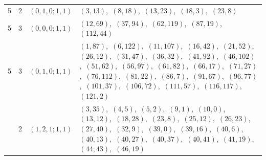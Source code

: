 \documentclass[11pt]{article}
\begin{document}
\begin{longtable}{@{}rrl>{\raggedright\arraybackslash}p{}@{}}
5 & 2 & $(0,1,0;1,1)$ & $(3,13)$,\allowbreak\ $(8,18)$,\allowbreak\ $(13,23)$,\allowbreak\ $(18,3)$,\allowbreak\ $(23,8)$\\
5 & 3 & $(0,0,0;1,1)$ & $(12,69)$,\allowbreak\ $(37,94)$,\allowbreak\ $(62,119)$,\allowbreak\ $(87,19)$,\allowbreak\ $(112,44)$\\
5 & 3 & $(0,1,0;1,1)$ & $(1,87)$,\allowbreak\ $(6,122)$,\allowbreak\ $(11,107)$,\allowbreak\ $(16,42)$,\allowbreak\ $(21,52)$,\allowbreak\ $(26,12)$,\allowbreak\ $(31,47)$,\allowbreak\ $(36,32)$,\allowbreak\ $(41,92)$,\allowbreak\ $(46,102)$,\allowbreak\ $(51,62)$,\allowbreak\ $(56,97)$,\allowbreak\ $(61,82)$,\allowbreak\ $(66,17)$,\allowbreak\ $(71,27)$,\allowbreak\ $(76,112)$,\allowbreak\ $(81,22)$,\allowbreak\ $(86,7)$,\allowbreak\ $(91,67)$,\allowbreak\ $(96,77)$,\allowbreak\ $(101,37)$,\allowbreak\ $(106,72)$,\allowbreak\ $(111,57)$,\allowbreak\ $(116,117)$,\allowbreak\ $(121,2)$\\
\addlinespace[3pt]
7 & 2 & $(1,2,1;1,1)$ & $(3,35)$,\allowbreak\ $(4,5)$,\allowbreak\ $(5,2)$,\allowbreak\ $(9,1)$,\allowbreak\ $(10,0)$,\allowbreak\ $(13,12)$,\allowbreak\ $(18,28)$,\allowbreak\ $(23,8)$,\allowbreak\ $(25,12)$,\allowbreak\ $(26,23)$,\allowbreak\ $(27,40)$,\allowbreak\ $(32,9)$,\allowbreak\ $(39,0)$,\allowbreak\ $(39,16)$,\allowbreak\ $(40,6)$,\allowbreak\ $(40,13)$,\allowbreak\ $(40,27)$,\allowbreak\ $(40,37)$,\allowbreak\ $(40,41)$,\allowbreak\ $(41,19)$,\allowbreak\ $(44,43)$,\allowbreak\ $(46,19)$\\

\end{longtable}
\end{document}

